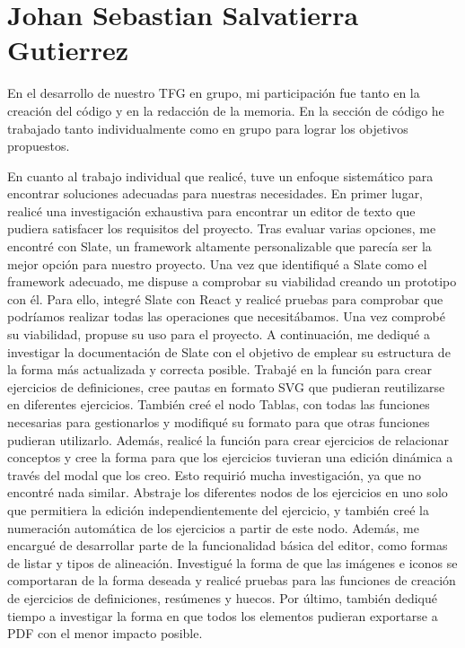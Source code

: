 \section{Johan Sebastian Salvatierra Gutierrez}
En el desarrollo de nuestro TFG en grupo, mi participación fue tanto en la creación del código y en la redacción de la memoria. En la sección de código he trabajado tanto individualmente como en grupo para lograr los objetivos propuestos.

En cuanto al trabajo individual que realicé, tuve un enfoque sistemático para encontrar soluciones adecuadas para nuestras necesidades. En primer lugar, realicé una investigación exhaustiva para encontrar un editor de texto que pudiera satisfacer los requisitos del proyecto. Tras evaluar varias opciones, me encontré con Slate, un framework altamente personalizable que parecía ser la mejor opción para nuestro proyecto. Una vez que identifiqué a Slate como el framework adecuado, me dispuse a comprobar su viabilidad creando un prototipo con él. Para ello, integré Slate con React y realicé pruebas para comprobar que podríamos realizar todas las operaciones que necesitábamos. Una vez comprobé su viabilidad, propuse su uso para el proyecto. A continuación, me dediqué a investigar la documentación de Slate con el objetivo de emplear su estructura de la forma más actualizada y correcta posible. Trabajé en la función para crear ejercicios de definiciones, cree pautas en formato SVG que pudieran reutilizarse en diferentes ejercicios. También creé el nodo Tablas, con todas las funciones necesarias para gestionarlos y modifiqué su formato para que otras funciones pudieran utilizarlo. Además, realicé la función para crear ejercicios de relacionar conceptos y cree la forma para que los ejercicios tuvieran una edición dinámica a través del modal que los creo. Esto requirió mucha investigación, ya que no encontré nada similar. Abstraje los diferentes nodos de los ejercicios en uno solo que permitiera la edición independientemente del ejercicio, y también creé la numeración automática de los ejercicios a partir de este nodo. Además, me encargué de desarrollar parte de la funcionalidad básica del editor, como formas de listar y tipos de alineación. Investigué la forma de que las imágenes e iconos se comportaran de la forma deseada y realicé pruebas para las funciones de creación de ejercicios de definiciones, resúmenes y huecos. Por último, también dediqué tiempo a investigar la forma en que todos los elementos pudieran exportarse a PDF con el menor impacto posible.

